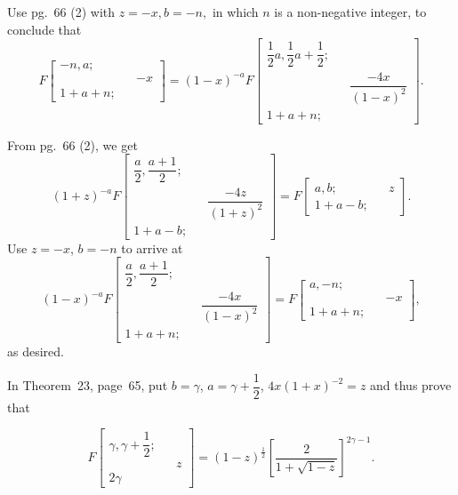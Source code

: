 \begin{problem}\label{problem9chapter4}
Use pg.~66 (2) with $z = -x, b=-n,$ in which $n$ is a non-negative integer, to conclude that
$$F \left[ \begin{array}{rlr}
-n,a; & & \\
& & -x \\
1+a+n;
\end{array} \right] = (1-x)^{-a} F \left[ \begin{array}{rlr}
\dfrac{1}{2}a,\dfrac{1}{2}a+\dfrac{1}{2}; & & \\
& & \dfrac{-4x}{(1-x)^2} \\
1+a+n ;
\end{array} \right].$$
\end{problem}
\begin{solution}
From pg.~66 (2), we get
$$(1+z)^{-a} F \left[ \begin{array}{rlr}
\dfrac{a}{2}, \dfrac{a+1}{2}; & & \\
& & \dfrac{-4z}{(1+z)^2} \\
1+a-b; & & 
\end{array} \right] = F \left[ \begin{array}{rlr}
a,b;
& & z \\
1+a-b;
\end{array} \right].$$
Use $z = -x$, $b = -n$ to arrive at 
$$(1-x)^{-a} F \left[ \begin{array}{rlr}
\dfrac{a}{2}, \dfrac{a+1}{2}; & & \\
& & \dfrac{-4x}{(1-x)^2} \\
1+a+n; & & 
\end{array} \right] = F \left[ \begin{array}{rlr}
a, -n; & & \\
& & -x \\
1+a+n; & &
\end{array} \right],$$
as desired. 
\end{solution}
\begin{problem}\label{problem10chapter4}
In Theorem~23, page~65, put $b= \gamma$, $a = \gamma + \dfrac{1}{2}$, $4x(1+x)^{-2} = z$ and thus prove that

$$F \left[ \begin{array}{rlr}
\gamma, \gamma + \dfrac{1}{2}; & & \\
& & z \\
2 \gamma
\end{array} \right] = (1-z)^{\frac{1}{2}} \left[ \dfrac{2}{1+\sqrt{1-z}} \right]^{2 \gamma - 1}.$$
\end{problem}
